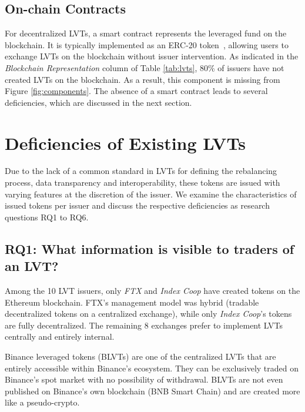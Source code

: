 \subsection{On-chain Contracts}
For decentralized LVTs, a smart contract represents the leveraged fund on the blockchain. It is typically implemented as an ERC-20 token~\cite{Interface,ansari2020implementation,shirole2020cryptocurrency}, allowing users to exchange LVTs on the blockchain without issuer intervention. As indicated in the \textsl{Blockchain Representation} column of Table \ref{tab:lvts}, 80\% of issuers have not created LVTs on the blockchain. As a result, this component is missing from Figure \ref{fig:components}. The absence of a smart contract leads to several deficiencies, which are discussed in the next section.

\section{Deficiencies of Existing LVTs}
Due to the lack of a common standard in LVTs for defining the rebalancing process, data transparency and interoperability, these tokens are issued with varying features at the discretion of the issuer. We examine the characteristics of issued tokens per issuer and discuss the respective deficiencies as research questions RQ1 to RQ6.

\subsection*{RQ1: What information is visible to traders of an LVT?}\label{subsec:blockchain}
Among the 10 LVT issuers, only \textsl{FTX} and \textsl{Index Coop} have created tokens on the Ethereum blockchain. FTX's management model was hybrid (\ie tradable decentralized tokens on a centralized exchange), while only \textsl{Index Coop}'s tokens are fully decentralized. The remaining 8 exchanges prefer to implement LVTs centrally and entirely internal.
\begin{example}
	Binance leveraged tokens (BLVTs) are one of the centralized LVTs that are entirely accessible within Binance's ecosystem. They can be exclusively traded on Binance's spot market with no possibility of withdrawal. BLVTs are not even published on Binance's own blockchain (BNB Smart Chain) and are created more like a pseudo-crypto.
\end{example}

